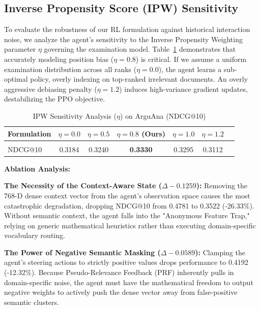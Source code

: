 \subsection{Inverse Propensity Score (IPW) Sensitivity}
To evaluate the robustness of our RL formulation against historical interaction noise, we analyze the agent's sensitivity to the Inverse Propensity Weighting parameter $\eta$ governing the examination model. Table~\ref{tab:ipw_sensitivity} demonstrates that accurately modeling position bias ($\eta=0.8$) is critical. If we assume a uniform examination distribution across all ranks ($\eta=0.0$), the agent learns a sub-optimal policy, overly indexing on top-ranked irrelevant documents. An overly aggressive debiasing penalty ($\eta=1.2$) induces high-variance gradient updates, destabilizing the PPO objective.

\begin{table}[htbp]
  \caption{IPW Sensitivity Analysis ($\eta$) on ArguAna (NDCG@10)}
  \begin{center}
    \begin{tabular}{lcccccc}
      \multicolumn{1}{l}{\bf Formulation} & \multicolumn{1}{c}{$\eta=0.0$} & \multicolumn{1}{c}{$\eta=0.5$} & \multicolumn{1}{c}{$\eta=0.8$ (Ours)} & \multicolumn{1}{c}{$\eta=1.0$} & \multicolumn{1}{c}{$\eta=1.2$} \\ \hline \\
      NDCG@10 & 0.3184 & 0.3240 & \textbf{0.3330} & 0.3295 & 0.3112 \\
    \end{tabular}
  \end{center}
  \label{tab:ipw_sensitivity}
\end{table}

\textbf{Ablation Analysis:}

\textbf{The Necessity of the Context-Aware State ($\Delta -0.1259$):} Removing the 768-D dense context vector from the agent's observation space causes the most catastrophic degradation, dropping NDCG@10 from 0.4781 to 0.3522 (-26.33\%). Without semantic context, the agent falls into the "Anonymous Feature Trap," relying on generic mathematical heuristics rather than executing domain-specific vocabulary routing.

\textbf{The Power of Negative Semantic Masking ($\Delta -0.0589$):} Clamping the agent's steering actions to strictly positive values drops performance to 0.4192 (-12.32\%). Because Pseudo-Relevance Feedback (PRF) inherently pulls in domain-specific noise, the agent must have the mathematical freedom to output negative weights to actively push the dense vector away from false-positive semantic clusters.

